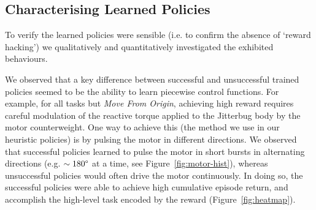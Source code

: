 \documentclass[letterpaper, 10 pt, conference]{ieeeconf}
\newcommand{\rowstyle}[1]{\gdef\currentrowstyle{#1}%
    #1\ignorespaces
}
\begin{document}
\begin{table}[ht]
{
    }
    
\end{table}

\subsection{Characterising Learned Policies}

To verify the learned policies were sensible (i.e. to confirm the absence of `reward hacking') we qualitatively and quantitatively investigated the exhibited behaviours.

We observed that a key difference between successful and unsuccessful trained policies seemed to be the ability to learn piecewise control functions.
For example, for all tasks but \emph{Move From Origin}, achieving high reward requires careful modulation of the reactive torque applied to the Jitterbug body by the motor counterweight.
One way to achieve this (the method we use in our heuristic policies) is by pulsing the motor in different directions.
We observed that successful policies learned to pulse the motor in short bursts in alternating directions (e.g. $\sim180\degree$ at a time, see Figure~\ref{fig:motor-hist}), whereas unsuccessful policies would often drive the motor continuously.
In doing so, the successful policies were able to achieve high cumulative episode return, and accomplish the high-level task encoded by the reward (Figure~\ref{fig:heatmap}).
\end{document}
